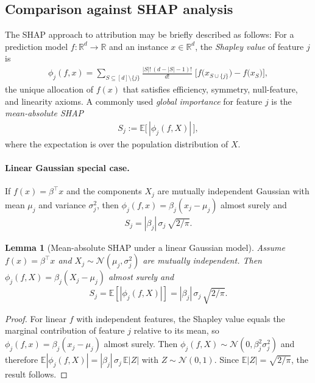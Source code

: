 \documentclass[pdflatex,sn-mathphys-num]{sn-jnl}%
\def\EQSP{3pt}
\newcommand{\cgather}[2][\EQSP]{\begingroup\setlength\abovedisplayskip{#1}\setlength\belowdisplayskip{#1}\begin{gather} #2 \end{gather}\endgroup\noindent}
\theoremstyle{thmstyleone}%
\newtheorem{lemma}[theorem]{Lemma} %
\theoremstyle{thmstyletwo}%
\theoremstyle{thmstylethree}%
\begin{document}
\subsection{Comparison against SHAP analysis}

The SHAP approach to attribution may be briefly described as follows: For a prediction model
$f:\mathbb R^{d}\to\mathbb R$ and an instance $x\in\mathbb R^{d}$, the \emph{Shapley value} of feature $j$
is
\cgather{
\phi_{j}(f,x)
=\!\!\sum_{S\subseteq[d]\setminus\{j\}}\!\!
   \frac{|S|!\,(d-|S|-1)!}{d!}\;
   \bigl[f\bigl(x_{S\cup\{j\}}\bigr)-f\bigl(x_{S}\bigr)\bigr],
}
the unique allocation of $f(x)$ that satisfies efficiency, symmetry,
null-feature, and linearity axioms.
A commonly used \emph{global importance} for feature $j$ is the
\emph{mean-absolute SHAP}
\cgather{
S_{j} := \mathbb E\bigl[\,|\phi_{j}(f,X)|\,\bigr],
\label{SHAP-MA}
}
where the expectation is over the population distribution of $X$.

\paragraph{Linear Gaussian special case.}
If $f(x)=\beta^{\top}x$ and the components $X_{j}$ are mutually independent Gaussian with mean $\mu_{j}$ and variance $\sigma_{j}^{2}$,
then $\phi_{j}(f,x)=\beta_{j}(x_{j}-\mu_{j})$ almost surely and
\cgather{
S_{j} = |\beta_{j}|\,\sigma_{j}\,\sqrt{2/\pi}.
\label{SHAP-MA-Lin}
}

\begin{lemma}[Mean-absolute SHAP under a linear Gaussian model]\label{lem:shap_lin_gauss}
Assume $f(x)=\beta^\top x$ and $X_j \sim \mathcal N(\mu_j,\sigma_j^2)$ are mutually independent.
Then $\phi_j(f,X)=\beta_j(X_j-\mu_j)$ almost surely and
\[
S_j = \mathbb E\!\left[|\phi_j(f,X)|\right]
=|\beta_j|\,\sigma_j\,\sqrt{2/\pi}.
\]
\end{lemma}

\begin{proof}
For linear $f$ with independent features, the Shapley value equals the marginal contribution of feature $j$ relative to its mean,
so $\phi_j(f,x)=\beta_j(x_j-\mu_j)$ almost surely.
Then $\phi_j(f,X)\sim \mathcal N(0,\beta_j^2\sigma_j^2)$ and therefore
$\mathbb E|\phi_j(f,X)| = |\beta_j|\,\sigma_j\,\mathbb E|Z|$ with $Z\sim\mathcal N(0,1)$.
Since $\mathbb E|Z|=\sqrt{2/\pi}$, the result follows.
\end{proof}
\end{document}

